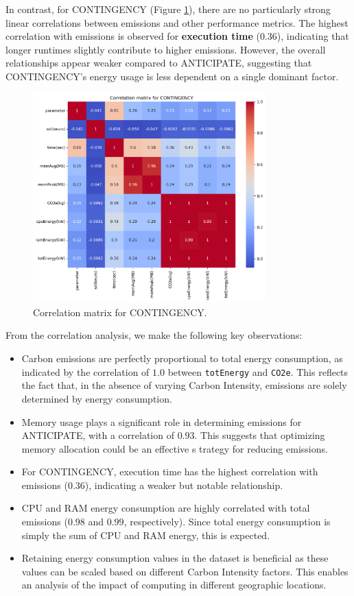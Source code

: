 \documentclass[a4paper,singleside,12pt]{report} %
\begin{document}
In contrast, for CONTINGENCY (Figure \ref{fig:cont_corr_mat}), there are no particularly strong linear correlations between emissions and other performance metrics. The highest correlation with 
emissions is observed for \textbf{execution time} ($0.36$), indicating that longer runtimes slightly contribute to higher emissions. However, the overall relationships appear weaker compared 
to ANTICIPATE, suggesting that CONTINGENCY’s energy usage is less dependent on a single dominant factor.

\begin{figure}[h!]
    \centering
    \includegraphics[width=0.8\textwidth]{imgs/cont_corr_mat.png}
    \caption{Correlation matrix for CONTINGENCY.}
    \label{fig:cont_corr_mat}
\end{figure}

From the correlation analysis, we make the following key observations:
\begin{itemize}
    \item Carbon emissions are perfectly proportional to total energy consumption, as indicated by the correlation of $1.0$ between \verb|totEnergy| and \verb|CO2e|. This reflects the fact 
    that, in the absence of varying Carbon Intensity, emissions are solely determined by energy consumption.
    \item Memory usage plays a significant role in determining emissions for ANTICIPATE, with a correlation of $0.93$. This suggests that optimizing memory allocation could be an effective s
    trategy for reducing emissions.
    \item For CONTINGENCY, execution time has the highest correlation with emissions ($0.36$), indicating a weaker but notable relationship.
    \item CPU and RAM energy consumption are highly correlated with total emissions ($0.98$ and $0.99$, respectively). Since total energy consumption is simply the sum of CPU and RAM energy, 
    this is expected.
    \item Retaining energy consumption values in the dataset is beneficial as these values can be scaled based on different Carbon Intensity factors. This enables an analysis of the impact 
    of computing in different geographic locations.
\end{itemize}
\end{document}

